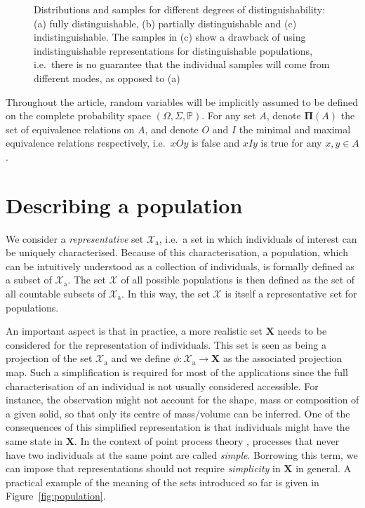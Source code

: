 \documentclass{aptpub}
\numberwithin{equation}{section}
\begin{document}
\begin{figure}
\centering

\scriptsize

\caption{Distributions and samples for different degrees of distinguishability: (a) fully distinguishable, (b) partially distinguishable and (c) indistinguishable. The samples in (c) show a drawback of using indistinguishable representations for distinguishable populations, i.e.\ there is no guarantee that the individual samples will come from different modes, as opposed to (a)}
\label{fig:distinguishability}
\end{figure}

Throughout the article, random variables will be implicitly assumed to be defined on the complete probability space $(\Omega,\Sigma,{\mathbb{P}})$. 
For any set $A$, denote ${\boldsymbol{\Pi}}(A)$ the set of equivalence relations on $A$, and denote $O$ and $I$ the minimal and maximal equivalence relations respectively, i.e.\ $xOy$ is false and $xIy$ is true for any $x,y \in A$.

\section{Describing a population}
\label{sec:generalPopRep}

We consider a \emph{representative} set ${\boldsymbol{\mathcal{X}}}_{\mathrm{a}}$, i.e.\ a set in which individuals of interest can be uniquely characterised. Because of this characterisation, a population, which can be intuitively understood as a collection of individuals, is formally defined as a subset of ${\boldsymbol{\mathcal{X}}}_{\mathrm{a}}$. The set ${\boldsymbol{\mathcal{X}}}$ of all possible populations is then defined as the set of all countable subsets of ${\boldsymbol{\mathcal{X}}}_{\mathrm{a}}$. In this way, the set ${\boldsymbol{\mathcal{X}}}$ is itself a representative set for populations.

An important aspect is that in practice, a more realistic set ${\mathbf{X}}$ needs to be considered for the representation of individuals. This set is seen as being a projection of the set ${\boldsymbol{\mathcal{X}}}_{\mathrm{a}}$ and we define $\phi : {\boldsymbol{\mathcal{X}}}_{\mathrm{a}} \to {\mathbf{X}}$ as the associated projection map. Such a simplification is required for most of the applications since the full characterisation of an individual is not usually considered accessible. For instance, the observation might not account for the shape, mass or composition of a given solid, so that only its centre of mass/volume can be inferred. One of the consequences of this simplified representation is that individuals might have the same state in ${\mathbf{X}}$. In the context of point process theory \citep{Daley2003}, processes that never have two individuals at the same point are called \emph{simple}. Borrowing this term, we can impose that representations should not require \emph{simplicity} in ${\mathbf{X}}$ in general. A practical example of the meaning of the sets introduced so far is given in Figure~\ref{fig:population}.
\end{document}

